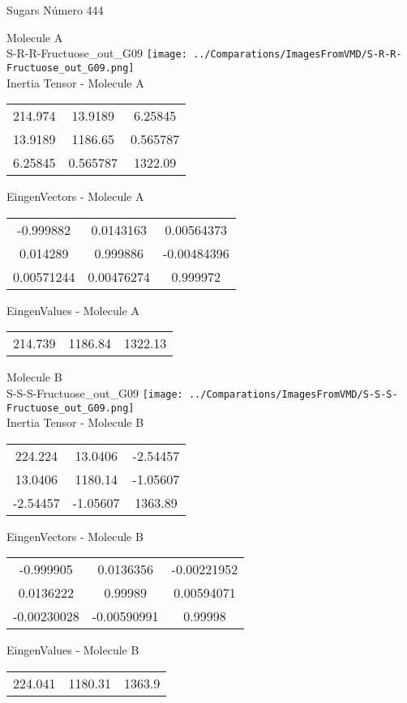 \vtab[-2cm]
\begin{center}
{\large Sugars \tab Número 444}
\end{center}
\begin{multicols}{2}
\begin{center}

Molecule A \\ 
S-R-R-Fructuose\_out\_G09
\texttt{[image: ../Comparations/ImagesFromVMD/S-R-R-Fructuose\_out\_G09.png]}
\\
Inertia Tensor - Molecule A \\
\vtab

\begin{tabular}{|c c c|}
214.974	 & 	13.9189	 & 	6.25845	 \\
13.9189	 & 	1186.65	 & 	0.565787	 \\
6.25845	 & 	0.565787	 & 	1322.09
\end{tabular}

\vtab
 EingenVectors - Molecule A     \\
\vtab
\begin{tabular}{|c c c|}
-0.999882	 & 	0.0143163	 & 	0.00564373	 \\
0.014289	 & 	0.999886	 & 	-0.00484396	 \\
0.00571244	 & 	0.00476274	 & 	0.999972
\end{tabular}

\vtab
 EingenValues - Molecule A     \\
\vtab
\begin{tabular}{|c c c|}
214.739	 & 	1186.84	 & 	1322.13	 \\
\end{tabular}
\columnbreak

Molecule B \\ 
S-S-S-Fructuose\_out\_G09
\texttt{[image: ../Comparations/ImagesFromVMD/S-S-S-Fructuose\_out\_G09.png]}
\\
Inertia Tensor - Molecule B \\
\vtab

\begin{tabular}{|c c c|}
224.224	 & 	13.0406	 & 	-2.54457	 \\
13.0406	 & 	1180.14	 & 	-1.05607	 \\
-2.54457	 & 	-1.05607	 & 	1363.89
\end{tabular}

\vtab
 EingenVectors - Molecule B     \\
\vtab
\begin{tabular}{|c c c|}
-0.999905	 & 	0.0136356	 & 	-0.00221952	 \\
0.0136222	 & 	0.99989	 & 	0.00594071	 \\
-0.00230028	 & 	-0.00590991	 & 	0.99998
\end{tabular}

\vtab
 EingenValues - Molecule B     \\
\vtab
\begin{tabular}{|c c c|}
224.041	 & 	1180.31	 & 	1363.9	 \\
\end{tabular}

\end{center}
\end{multicols}

